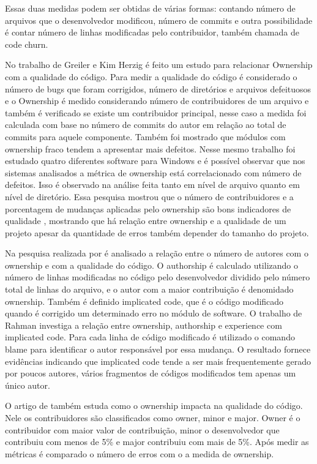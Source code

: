 Essas duas medidas podem ser obtidas de várias formas: contando número de arquivos que o desenvolvedor modificou, número de commits e outra possibilidade é contar número de linhas modificadas pelo contribuidor, também chamada de code churn\cite{Munson:1998:CCM:850947.853326}.

No trabalho de Greiler e Kim Herzig\cite{Greiler} é feito um estudo para relacionar Ownership com a qualidade do código. Para medir a qualidade do código é considerado o número de bugs que foram corrigidos, número de diretórios e arquivos defeituosos e o Ownership é medido considerando número de contribuidores de um arquivo e também é verificado se existe um contribuidor principal, nesse caso a medida foi calculada com base no número de commits do autor em relação ao total de commits para aquele componente. Também foi mostrado que módulos com ownership fraco tendem a apresentar mais defeitos. Nesse mesmo trabalho foi estudado quatro diferentes software para Windows e é possível observar que nos sistemas analisados a métrica de ownership está correlacionado com número de defeitos. Isso é observado na análise feita tanto em nível de arquivo quanto em nível de diretório.  
Essa pesquisa mostrou que o número de contribuidores e a porcentagem de mudanças aplicadas pelo ownership são bons indicadores de qualidade , mostrando que há relação entre ownership e a qualidade de um projeto apesar da quantidade de erros também depender do tamanho do projeto.

Na pesquisa realizada por  é analisado a relação entre o número de autores com o ownership e com a qualidade do código. O authorship é calculado utilizando o número de linhas modificadas no código pelo desenvolvedor dividido pelo número total de linhas do arquivo, e o autor com a maior contribuição é denomidado ownership. Também é definido implicated code, que é o código modificado quando é corrigido um determinado erro no módulo de software. O trabalho de Rahman investiga a relação entre ownership, authorship e experience com implicated code. Para cada linha de código modificado é utilizado o comando blame para identificar o autor responsável por essa mudança. O resultado fornece evidências indicando que implicated code tende a ser mais frequentemente gerado por poucos autores, vários fragmentos de códigos modificados tem apenas um único autor.

O artigo de  também estuda como o ownership impacta na qualidade do código. Nele os contribuidores são classificados como owner, minor e major. Owner é o contribuidor com maior valor de contribuição, minor o desenvolvedor que contribuiu com menos de 5\% e major contribuiu com mais de 5\%. Após medir as métricas é comparado o número de erros com o a medida de ownership.

